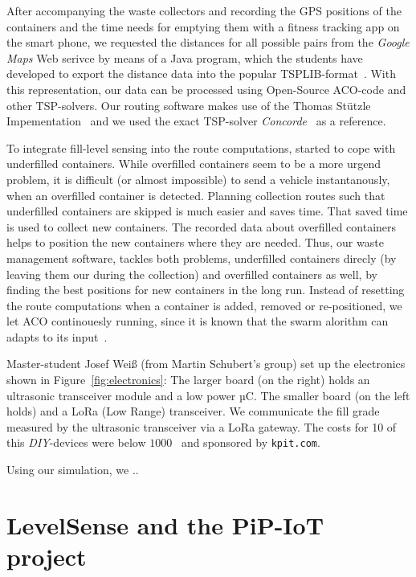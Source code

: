 \documentclass[10pt]{article}
\begin{document}
After accompanying
the waste collectors and recording the GPS positions of the containers and the time needs 
for emptying them with a fitness tracking app on the smart phone, we requested the
distances for all possible pairs from the {\it Google Maps} Web serivce by means of a 
Java program, which the students have developed to export the distance data into the
popular TSPLIB-format~\cite{tsplib90}. With this representation, our data can be 
processed using Open-Source ACO-code and other TSP-solvers. Our routing software makes
use of the Thomas St{\"u}tzle Impementation~\cite{Dorigo97} and we used the exact 
TSP-solver {\it Concorde}~\cite{applegate01} as a reference. 


To integrate fill-level sensing into the route computations, started to cope with
underfilled containers. While overfilled containers seem to be 
a more urgend problem, it is difficult (or almost impossible) to send a vehicle  
instantanously, when an overfilled container is detected. Planning collection 
routes such that underfilled containers are skipped is much easier and saves time.
That saved time is used to collect new containers. The recorded data about
overfilled containers helps to position the new containers where they are needed.
Thus, our waste management software, tackles both problems, underfilled containers direcly
(by leaving them our during the collection) and overfilled containers as well, 
by finding the best positions for new containers in the long run. Instead of
resetting the route computations when a container is added, removed or 
re-positioned, we let ACO continouesly running, since it is known that the 
swarm alorithm can adapts to its input~\cite{angus2005}.

Master-student Josef Wei{\ss} (from Martin Schubert's group) set up the electronics
shown in Figure~\ref{fig:electronics}: The larger board (on the right) holds an ultrasonic transceiver module and a low power µC. The smaller board (on the left holds) and a 
LoRa (Low Range) transceiver. We communicate the fill grade measured by the 
ultrasonic transceiver via a LoRa gateway. The costs for 10 of this {\it DIY}-devices 
were below $1000$~\EUR{} and sponsored by {\tt kpit.com}.

Using our simulation, we ..

\section{LevelSense and the PiP-IoT project}
\label{sec:Christchurch}
\end{document}
